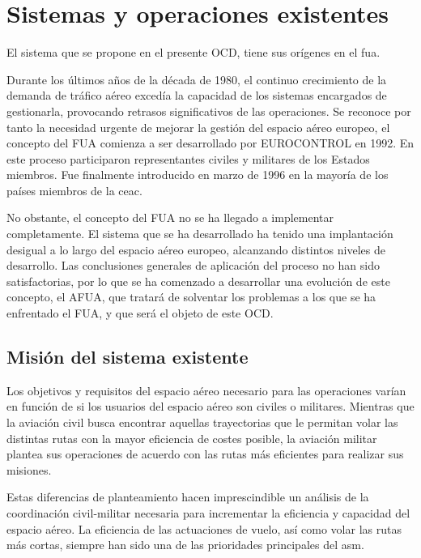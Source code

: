 \chapter{Sistemas y operaciones existentes}

El sistema que se propone en el presente OCD, tiene sus orígenes en el \acrfull{fua}.

Durante los últimos años de la década de 1980, el continuo crecimiento de la demanda de tráfico aéreo excedía la capacidad de los sistemas encargados de gestionarla, provocando retrasos significativos de las operaciones. Se reconoce por tanto la necesidad urgente de mejorar la gestión del espacio aéreo europeo, el concepto del FUA comienza a ser desarrollado por EUROCONTROL en 1992. En este proceso participaron representantes civiles y militares de los Estados miembros. Fue finalmente introducido en marzo de 1996 en la mayoría de los países miembros de la \acrfull{ceac}.

No obstante, el concepto del FUA no se ha llegado a implementar completamente. El sistema que se ha desarrollado ha tenido una implantación desigual a lo largo del espacio aéreo europeo, alcanzando distintos niveles de desarrollo. Las conclusiones generales de aplicación del proceso no han sido satisfactorias, por lo que se ha comenzado a desarrollar una evolución de este concepto, el AFUA, que tratará de solventar los problemas a los que se ha enfrentado el FUA, y que será el objeto de este OCD.

\section{Misión del sistema existente}

Los objetivos y requisitos del espacio aéreo necesario para las operaciones varían en función de si los usuarios del espacio aéreo son civiles o militares. Mientras que la aviación civil busca encontrar aquellas trayectorias que le permitan volar las distintas rutas con la mayor eficiencia de costes posible, la aviación militar plantea sus operaciones de acuerdo con las rutas más eficientes para realizar sus misiones. 

Estas diferencias de planteamiento hacen imprescindible un análisis de la coordinación civil-militar necesaria para incrementar la eficiencia y capacidad del espacio aéreo. La eficiencia de las actuaciones de vuelo, así como volar las rutas más cortas, siempre han sido una de las prioridades principales del \acrfull{asm}.

